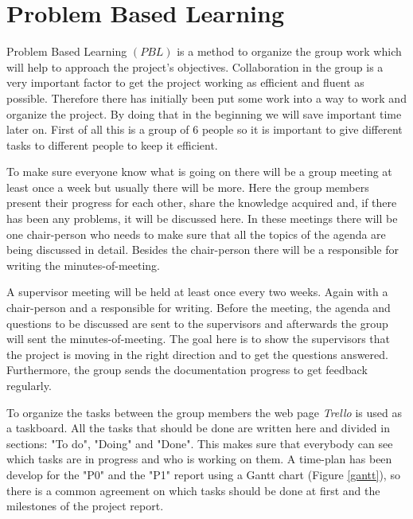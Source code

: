 \section{Problem Based Learning} 
\label{PBL}

Problem Based Learning $(PBL)$ is a method to organize the group work which will help to approach the project's objectives. Collaboration in the group is a very important factor to get the project working as efficient and fluent as possible.
Therefore there has initially been put some work into a way to work and organize the project. By doing that in the beginning we will save important time later on.
First of all this is a group of 6 people so it is important to give different tasks to different people to keep it efficient. 

To make sure everyone know what is going on there will be a group meeting at least once a week but usually there will be more. Here the group members present their progress for each other, share the knowledge acquired and, if there has been any problems, it will be discussed here. In these meetings there will be one chair-person who needs to make sure that all the topics of the agenda are being discussed in detail. Besides the chair-person there will be a responsible for writing the minutes-of-meeting. 

A supervisor meeting will be held at least once every two weeks. Again with a chair-person and a responsible for writing. Before the meeting, the agenda and questions to be discussed are sent to the supervisors and afterwards the group will sent the minutes-of-meeting. The goal here is to show the supervisors that the project is moving in the right direction and to get the questions answered. Furthermore, the group sends the documentation progress to get feedback regularly.

To organize the tasks between the group members the web page \textit{Trello} is used as a taskboard. All the tasks that should be done are written here and divided in sections: "To do", "Doing" and "Done". This makes sure that everybody can see which tasks are in progress and who is working on them. A time-plan has been develop for the "P0" and the "P1" report using a Gantt chart (Figure \ref{gantt}), so there is a common agreement on which tasks should be done at first and the milestones of the project report.              
